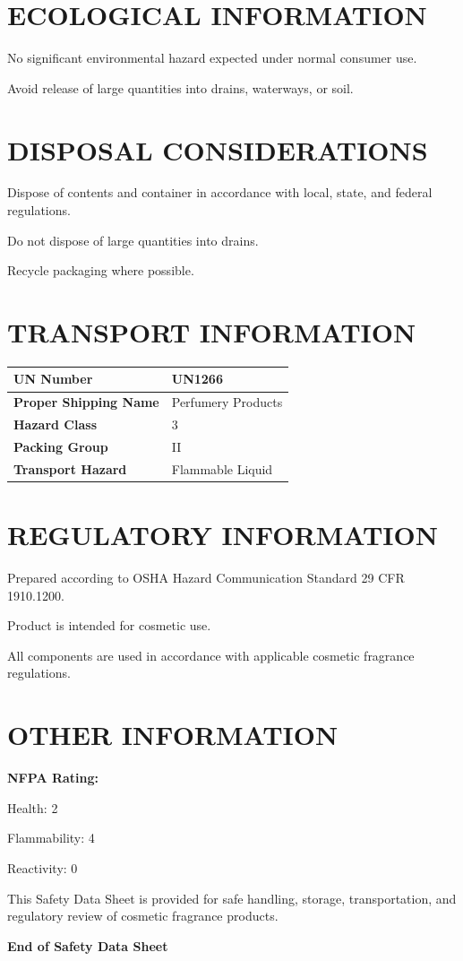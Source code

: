 \documentclass[11pt]{article}
\begin{document}
\section{ECOLOGICAL INFORMATION}

No significant environmental hazard expected under normal consumer use.

Avoid release of large quantities into drains, waterways, or soil.

\section{DISPOSAL CONSIDERATIONS}

Dispose of contents and container in accordance with local, state, and federal regulations.

Do not dispose of large quantities into drains.

Recycle packaging where possible.

\section{TRANSPORT INFORMATION}

\begin{longtable}{|p{2.5in}|p{3in}|}
\hline
\textbf{UN Number} & UN1266 \\
\hline
\textbf{Proper Shipping Name} & Perfumery Products \\
\hline
\textbf{Hazard Class} & 3 \\
\hline
\textbf{Packing Group} & II \\
\hline
\textbf{Transport Hazard} & Flammable Liquid \\
\hline
\end{longtable}

\section{REGULATORY INFORMATION}

Prepared according to OSHA Hazard Communication Standard 29 CFR 1910.1200.

Product is intended for cosmetic use.

All components are used in accordance with applicable cosmetic fragrance regulations.

\section{OTHER INFORMATION}

\textbf{NFPA Rating:}

Health: 2

Flammability: 4

Reactivity: 0

\vspace{10pt}

This Safety Data Sheet is provided for safe handling, storage, transportation, and regulatory review of cosmetic fragrance products.

\vfill

\begin{center}
\textbf{End of Safety Data Sheet}
\end{center}
\end{document}
